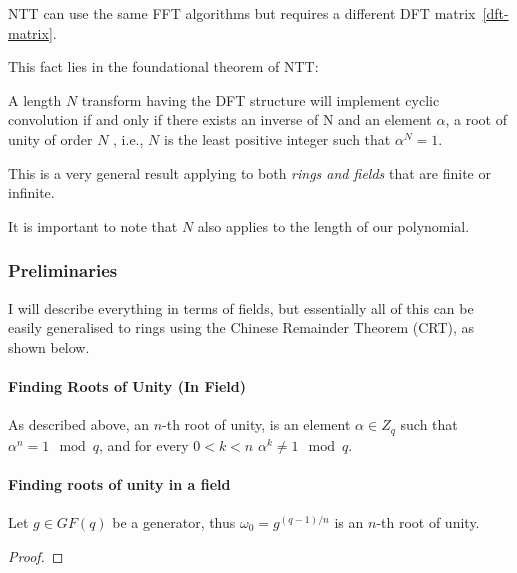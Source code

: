NTT can use the same FFT algorithms but requires a 
different DFT matrix~\ref{dft-matrix}.

This fact lies in the foundational theorem of NTT:
\begin{theorem}
  A length $N$ transform having the DFT structure will
  implement cyclic convolution if and only if there exists an 
  inverse of N and an element $\alpha$,
  a root of unity of order $N$ , i.e., $N$ is the least 
  positive integer such that $\alpha^N =1$.
\end{theorem}
This is a very general result applying to both \emph{rings and fields} that are
finite or infinite.

It is important to note that $N$ also applies to the length of our polynomial.

\subsubsection{Preliminaries}
I will describe everything in terms of fields, but essentially all of this can be easily generalised to rings 
using the Chinese Remainder Theorem (CRT), as shown below.
\paragraph{ Finding Roots of Unity (In Field)}
As described above, an $n$-th root of unity, is an element $\alpha\in Z_q$ 
such that $\alpha^n =1  \mod q $, and for every $0<k<n$ $\alpha^k \neq 1 \mod q$.

\paragraph{Finding roots of unity in a field}

\begin{theorem}
  Let $g\in GF(q)$ be a generator, thus
  $\omega_0=g^{(q-1)/n}$ is an $n$-th root of unity.
\end{theorem}
\begin{proof}
\end{proof}

